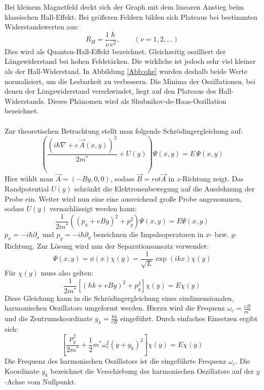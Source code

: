 Bei kleinem Magnetfeld deckt sich der Graph mit dem linearen Anstieg beim
klassischen Hall-Effekt. Bei größeren Feldern bilden sich Plateaus bei bestimmten 
Widerstandswerten aus:
\[
	R_{H} = \frac{1}{\nu} \frac{\hbar}{e^{2}}, \qquad (\nu=1,2,\dots)
\]
Dies wird als Quanten-Hall-Effekt bezeichnet.
Gleichzeitig oszilliert der Längswiderstand bei hohen Feldstärken. Die wirkliche
ist jedoch sehr viel kleiner als der Hall-Widerstand. In Abbildung \ref{Abb:qhe}
wurden deshalb beide Werte normalisiert, um die Lesbarkeit zu verbessern. 
Die Minima der Oszillationen, bei denen der Längswiderstand verschwindet, liegt auf
den Plateaus des Hall-Widerstands. Dieses Phänomen wird als
Shubnikov-de-Haas-Oszillation bezeichnet.\\\\
Zur theoretischen Betrachtung stellt man folgende Schrödingergleichung auf:
\[
	\left(
		\frac{( i\hbar\nabla+e \, \vec{A}(x,y) )^{2}}{2m^{*}} + U(y)
	\right) \Psi(x,y) = E \, \Psi(x,y)
\]
Hier wählt man $\vec{A} = (-By,0,0)$, sodass $\vec{B} = rot \vec{A}$ in $z$-Richtung
zeigt. Das Randpotential $U(y)$ schränkt die Elektronenbewegung auf die Ausdehnung
der Probe ein.
Weiter wird nun eine eine ausreichend große Probe angenommen, sodass $U(y)$ 
vernachlässigt werden kann:
\newcommand{\zweim}{\frac{1}{2m^{*}}}
\[{}
	\zweim \left( (p_{x} + e B y)^{2} + p_{y}^{2}\right) \Psi(x,y) = E \Psi(x,y)
\]
$p_{x} = - i \hbar \partial_{x}$ und $p_{y} = - i \hbar \partial_{y}$ bezeichnen die
Impulsoperatoren in $x$- bzw. $y$-Richtung.
Zur Lösung wird nun der Separationsansatz verwendet:
\[
	\Psi(x,y) = \phi(x) \chi(y) = \frac{1}{\sqrt{L}} \exp(ikx) \chi(y)
\]
Für $\chi(y)$ muss also gelten:
\[
	\zweim \left[ (\hbar k + eBy)^{2} + p_{y}^{2} \right] \chi(y) = E \chi(y)
\]
Diese Gleichung kann in die Schrödingergleichung eines eindimensionalen,
harmonischen Oszillators umgeformt werden. Hierzu wird die Frequenz
$\omega_{c} = \frac{e B}{m^{*}}$ und die Zentrumskoordinate 
$y_{k} = \frac{\hbar k}{eB}$ eingeführt. Durch einfaches Einsetzen ergibt sich:
\[
	\left[ \frac{p_{y}^{2}}{2m^{*}} + \frac{1}{2} m^{*} \omega_{c}^{2}
	(y + y_{k})^{2} \right] \chi(y) = E \chi(y)
\]
Die Frequenz des harmonischen Oszillators ist die eingeführte Frequenz $\omega_{c}$.
Die Koordinate $y_{k}$ bezeichnet die Verschiebung des harmonischen Oszillators auf
der $y$-Achse vom Nullpunkt.
